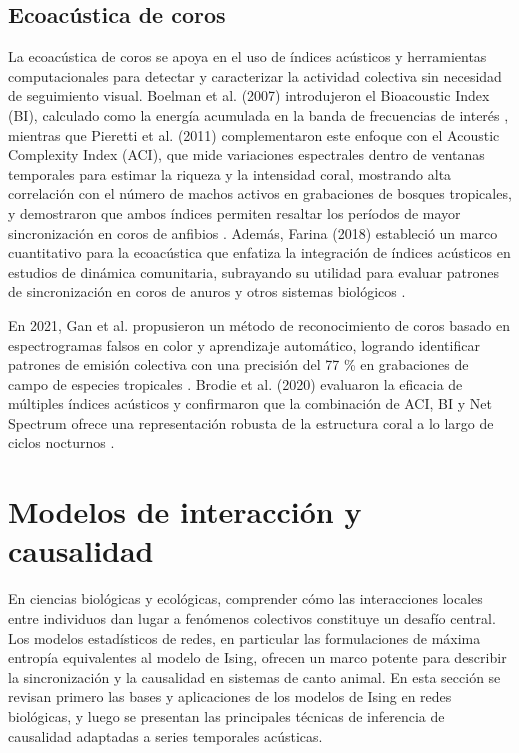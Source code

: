 \subsection{Ecoacústica de coros}
La ecoacústica de coros se apoya en el uso de índices 
acústicos y herramientas computacionales para detectar y 
caracterizar la actividad colectiva sin necesidad de 
seguimiento visual. Boelman et al. (2007) introdujeron el
Bioacoustic Index (BI), calculado como la energía acumulada 
en la banda de frecuencias de interés \cite{boelman2007multi}, 
mientras que Pieretti et al. (2011) complementaron este enfoque con el 
Acoustic Complexity Index (ACI), que mide variaciones 
espectrales dentro de ventanas temporales para estimar la 
riqueza y la intensidad coral, mostrando alta correlación con 
el número de machos activos en grabaciones de bosques 
tropicales, y demostraron que ambos 
índices permiten resaltar 
los períodos de mayor sincronización en coros de anfibios 
\cite{pieretti2011new}. 
Además, Farina (2018) estableció un marco cuantitativo para la 
ecoacústica que enfatiza la integración de índices acústicos en 
estudios de dinámica comunitaria, subrayando su utilidad para 
evaluar patrones de sincronización en coros de anuros y otros 
sistemas biológicos \cite{farina2018ecoacoustics}.

En 2021, Gan et al. propusieron un método de reconocimiento 
de coros basado en espectrogramas falsos en color y 
aprendizaje automático, logrando identificar patrones de 
emisión colectiva con una precisión del 77 \% en grabaciones 
de campo de especies tropicales \cite{gan2021novel}. Brodie et al. 
(2020) evaluaron la eficacia de múltiples índices acústicos y 
confirmaron que la combinación de ACI, BI y Net Spectrum 
ofrece una representación robusta de la estructura coral a lo 
largo de ciclos nocturnos \cite{brodie2020automated}.


\section{Modelos de interacción y causalidad}
\label{sec:modelos_interaccion}

En ciencias biológicas y ecológicas, comprender cómo las 
interacciones locales entre individuos dan lugar a fenómenos 
colectivos constituye un desafío central. Los modelos 
estadísticos de redes, en particular las formulaciones de 
máxima entropía equivalentes al modelo de Ising, ofrecen un 
marco potente para describir la sincronización y la causalidad 
en sistemas de canto animal. En esta sección se revisan primero 
las bases y aplicaciones de los modelos de Ising en redes 
biológicas, y luego se presentan las principales técnicas de 
inferencia de causalidad adaptadas a series temporales acústicas.

